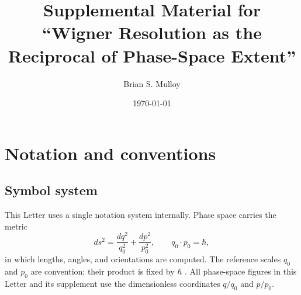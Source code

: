 \documentclass[%
  aps, amsmath, amssymb, onecolumn, 11pt
]{revtex4-2}
\begin{document}
\title{Supplemental Material for\\``Wigner Resolution as the Reciprocal of Phase-Space Extent''}

\author{Brian S. Mulloy}

\date{\today}

\maketitle



\section{Notation and conventions}
\label{sec:notation}

\subsection{Symbol system}
\label{sec:symbols}

This Letter uses a single notation system internally. Phase space carries the metric
\begin{equation}
ds^2 = \frac{dq^2}{q_0^2} + \frac{dp^2}{p_0^2}, \qquad q_0 \cdot p_0 = \hbar,
\label{eq:metric}
\end{equation}
in which lengths, angles, and orientations are computed. The reference scales $q_0$ and $p_0$ are convention; their product is fixed by $\hbar$ \cite{degosson2013qblobs, degossoncharlyne2022}. All phase-space figures in this Letter and its supplement use the dimensionless coordinates $q/q_0$ and $p/p_0$.
\end{document}
